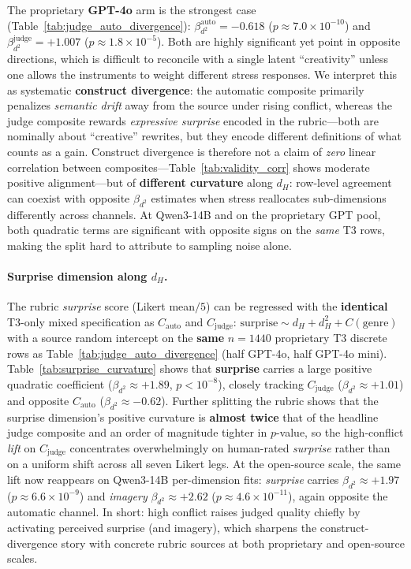 \documentclass[sigconf,nonacm]{acmart}
\begin{document}
The proprietary \textbf{GPT-4o} arm is the strongest case (Table~\ref{tab:judge_auto_divergence}): $\beta_{d^2}^{\mathrm{auto}}{=}{-}0.618$ ($p{\approx}7.0{\times}10^{-10}$) and $\beta_{d^2}^{\mathrm{judge}}{=}{+}1.007$ ($p{\approx}1.8{\times}10^{-5}$).
Both are highly significant yet point in opposite directions, which is difficult to reconcile with a single latent ``creativity'' unless one allows the instruments to weight different stress responses.
We interpret this as systematic \textbf{construct divergence}: the automatic composite primarily penalizes \emph{semantic drift} away from the source under rising conflict, whereas the judge composite rewards \emph{expressive surprise} encoded in the rubric---both are nominally about ``creative'' rewrites, but they encode different definitions of what counts as a gain.
Construct divergence is therefore not a claim of \emph{zero} linear correlation between composites---Table~\ref{tab:validity_corr} shows moderate positive alignment---but of \textbf{different curvature} along $d_H$: row-level agreement can coexist with opposite $\beta_{d^2}$ estimates when stress reallocates sub-dimensions differently across channels.
At Qwen3-14B and on the proprietary GPT pool, both quadratic terms are significant with opposite signs on the \emph{same} T3 rows, making the split hard to attribute to sampling noise alone.

\paragraph{Surprise dimension along $d_H$.}
The rubric \emph{surprise} score (Likert mean$/5$) can be regressed with the \textbf{identical} T3-only mixed specification as $C_{\mathrm{auto}}$ and $C_{\mathrm{judge}}$: $\mathrm{surprise}{\sim} d_H{+}d_H^2{+}C(\mathrm{genre})$ with a source random intercept on the \textbf{same} $n{=}1440$ proprietary T3 discrete rows as Table~\ref{tab:judge_auto_divergence} (half GPT-4o, half GPT-4o mini).
Table~\ref{tab:surprise_curvature} shows that \textbf{surprise} carries a large positive quadratic coefficient ($\beta_{d^2}{\approx}{+}1.89$, $p{<}10^{-8}$), closely tracking $C_{\mathrm{judge}}$ ($\beta_{d^2}{\approx}{+}1.01$) and opposite $C_{\mathrm{auto}}$ ($\beta_{d^2}{\approx}{-}0.62$).
Further splitting the rubric shows that the surprise dimension's positive curvature is \textbf{almost twice} that of the headline judge composite and an order of magnitude tighter in $p$-value, so the high-conflict \emph{lift} on $C_{\mathrm{judge}}$ concentrates overwhelmingly on human-rated \emph{surprise} rather than on a uniform shift across all seven Likert legs.
At the open-source scale, the same lift now reappears on Qwen3-14B per-dimension fits: \emph{surprise} carries $\beta_{d^2}{\approx}{+}1.97$ ($p{\approx}6.6{\times}10^{-9}$) and \emph{imagery} $\beta_{d^2}{\approx}{+}2.62$ ($p{\approx}4.6{\times}10^{-11}$), again opposite the automatic channel.
In short: high conflict raises judged quality chiefly by activating perceived surprise (and imagery), which sharpens the construct-divergence story with concrete rubric sources at both proprietary and open-source scales.
\end{document}
